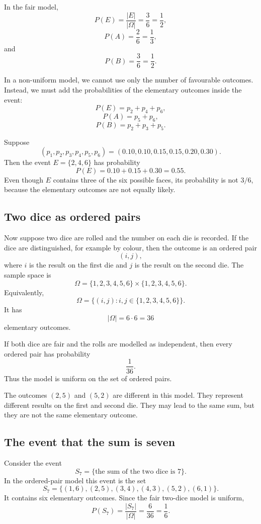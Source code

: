 In the fair model,
\[
P(E)=\frac{|E|}{|\Omega|}=\frac36=\frac12,
\]
\[
P(A)=\frac26=\frac13,
\]
and
\[
P(B)=\frac36=\frac12.
\]

In a non-uniform model, we cannot use only the number of favourable outcomes.
Instead, we must add the probabilities of the elementary outcomes inside the
event:
\[
P(E)=p_2+p_4+p_6,
\]
\[
P(A)=p_5+p_6,
\]
\[
P(B)=p_2+p_3+p_5.
\]

\begin{examplebox}
Suppose
\[
(p_1,p_2,p_3,p_4,p_5,p_6)=(0.10,0.10,0.15,0.15,0.20,0.30).
\]
Then the event \(E=\{2,4,6\}\) has probability
\[
P(E)=0.10+0.15+0.30=0.55.
\]
Even though \(E\) contains three of the six possible faces, its probability is
not \(3/6\), because the elementary outcomes are not equally likely.
\end{examplebox}

\subsection*{Two dice as ordered pairs}

Now suppose two dice are rolled and the number on each die is recorded. If the
dice are distinguished, for example by colour, then the outcome is an ordered
pair
\[
(i,j),
\]
where \(i\) is the result on the first die and \(j\) is the result on the second
die. The sample space is
\[
\Omega=\{1,2,3,4,5,6\}\times\{1,2,3,4,5,6\}.
\]
Equivalently,
\[
\Omega=\{(i,j):i,j\in\{1,2,3,4,5,6\}\}.
\]
It has
\[
|\Omega|=6\cdot 6=36
\]
elementary outcomes.

If both dice are fair and the rolls are modelled as independent, then every
ordered pair has probability
\[
\frac1{36}.
\]
Thus the model is uniform on the set of ordered pairs.

\begin{remarkbox}
The outcomes \((2,5)\) and \((5,2)\) are different in this model. They represent
different results on the first and second die. They may lead to the same sum,
but they are not the same elementary outcome.
\end{remarkbox}

\subsection*{The event that the sum is seven}

Consider the event
\[
S_7=\{\text{the sum of the two dice is }7\}.
\]
In the ordered-pair model this event is the set
\[
S_7=\{(1,6),(2,5),(3,4),(4,3),(5,2),(6,1)\}.
\]
It contains six elementary outcomes. Since the fair two-dice model is uniform,
\[
P(S_7)=\frac{|S_7|}{|\Omega|}=\frac6{36}=\frac16.
\]

